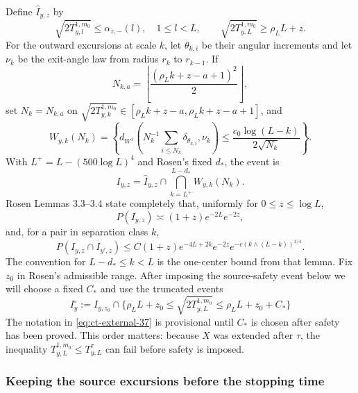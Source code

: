 Define $\widehat I_{y,z}$ by
\begin{equation}
\sqrt{2T_{y,l}^{1,m_0}}\le\alpha_{z,-}(l),\quad1\le l<L,
 \qquad \sqrt{2T_{y,L}^{1,m_0}}\ge\rho_LL+z.\label{eq:ct-external-32}
\end{equation}
For the outward excursions at scale $k$, let $\theta_{k,i}$ be their
angular increments and let $\nu_k$ be the exit-angle law from radius
$r_k$ to $r_{k-1}$.  If
\[
N_{k,a}=\left\lfloor\frac{(\rho_Lk+z-a+1)^2}{2}\right\rfloor,
\]
 set $N_k=N_{k,a}$ on
$\sqrt{2T_{y,k}^{1,m_0}}\in[\rho_Lk+z-a,\rho_Lk+z-a+1]$, and
\begin{equation}
W_{y,k}(N_k)=\left\{
 d_{W^1}\left(N_k^{-1}\sum_{i\le N_k}\delta_{\theta_{k,i}},
                 \nu_k\right)
 \le\frac{c_0\log(L-k)}{2\sqrt{N_k}}\right\}.\label{eq:ct-external-33}
\end{equation}
With $L^+=L-(500\log L)^4$ and Rosen's fixed $d_*$, the event is
\begin{equation}
I_{y,z}=\widehat I_{y,z}
          \cap\bigcap_{k=L^+}^{L-d_*}W_{y,k}(N_k).\label{eq:ct-external-34}
\end{equation}
Rosen Lemmas 3.3--3.4 state completely that, uniformly for
$0\le z\le\log L$,
\begin{equation}
P(I_{y,z})\asymp(1+z)e^{-2L}e^{-2z},\label{eq:ct-external-35}
\end{equation}
and, for a pair in separation class $k$,
\begin{equation}
P(I_{y,z}\cap I_{y',z})
 \le C(1+z)e^{-4L+2k}e^{-2z}
       e^{-c(k\wedge(L-k))^{1/4}}.\label{eq:ct-external-36}
\end{equation}
The convention for $L-d_*\le k<L$ is the one-center bound from that
lemma.  Fix $z_0$ in Rosen's admissible range.  After imposing the
source-safety event below we will choose a fixed $C_*$ and use the
truncated events
\begin{equation}
I_{y}^{\circ}:=I_{y,z_0}\cap
 \{\rho_LL+z_0\le\sqrt{2T_{y,L}^{1,m_0}}
                         \le\rho_LL+z_0+C_*\}\label{eq:ct-external-37}
\end{equation}
The notation in \eqref{eq:ct-external-37} is provisional until $C_*$ is chosen after
safety has been proved.  This order matters: because $X$ was extended
after $\tau$, the inequality
$T_{y,L}^{1,m_0}\le T_{y,L}^{\tau}$ can fail before safety is imposed.

\subsubsection{Keeping the source excursions before the stopping time}

